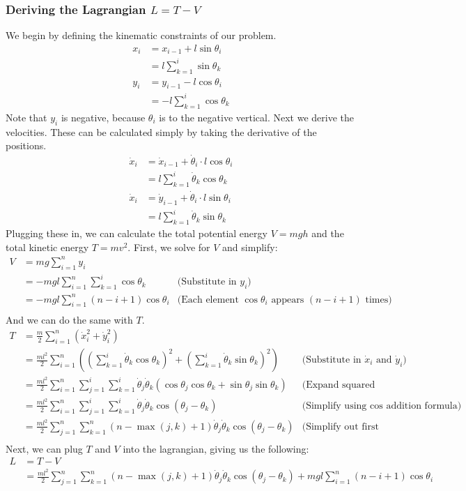 \documentclass{article}
\begin{document}
\subsubsection{Deriving the Lagrangian \texorpdfstring{$L=T-V$}{L=T-V}}
We begin by defining the kinematic constraints of our problem.
\begin{align*}
	x_i &= x_{i-1} + l\sin{\theta_i}\\
	&= l\sum_{k=1}^i\sin{\theta_k}\\
	y_i &= y_{i-1} - l\cos{\theta_i}\\
	&= -l\sum_{k=1}^i\cos{\theta_k}
\end{align*}
Note that $y_i$ is negative, because $\theta_i$ is to the negative vertical. Next we derive the velocities. These can be calculated simply by taking the derivative of the positions.
\begin{align*}
	\dot{x}_i &= \dot x_{i-1} + \dot\theta_i \cdot l\cos{\theta_i}\\
	&= l\sum_{k=1}^i\dot\theta_k\cos{\theta_k}\\
	\dot{x}_i &= \dot y_{i-1} + \dot\theta_i \cdot l\sin{\theta_i}\\
	&= l\sum_{k=1}^i\dot\theta_k\sin{\theta_k}
\end{align*}
Plugging these in, we can calculate the total potential energy $V=mgh$ and the total kinetic energy $T=mv^2$. First, we solve for $V$ and simplify:
\begin{align*}
	V &= mg\sum_{i=1}^n y_i \\
	&=-mgl\sum_{i=1}^n\sum_{k=1}^i\cos\theta_k
	&\text{(Substitute in $y_i$)}\\
	&=-mgl\sum_{i=1}^n (n-i+1)\cos\theta_i
	&\text{(Each element $\cos\theta_i$ appears $(n-i+1)$ times)}\\
\end{align*}
And we can do the same with $T$.
\begin{align*}
	T &= \frac{m}{2}\sum_{i=1}^n (\dot{x}_i^2+\dot{y}_i^2)\\
	&= \frac{ml^2}{2}\sum_{i=1}^n \left(\left(\sum_{k=1}^i\dot\theta_k\cos{\theta_k}\right)^2+\left(\sum_{k=1}^i\dot\theta_k\sin{\theta_k}\right)^2\right)
	&\text{(Substitute in $\dot x_i$ and $\dot y_i$)}\\
	&= \frac{ml^2}{2}\sum_{i=1}^n \sum_{j=1}^i\sum_{k=1}^i\dot\theta_j\dot\theta_k\left(\cos{\theta_j}\cos{\theta_k}+\sin{\theta_j}\sin{\theta_k}\right)
	&\text{(Expand squared sums)}\\
	&= \frac{ml^2}{2}\sum_{i=1}^n \sum_{j=1}^i\sum_{k=1}^i\dot\theta_j\dot\theta_k\cos(\theta_j-\theta_k)
	&\text{(Simplify using $\cos$ addition formula)}\\
	&= \frac{ml^2}{2} \sum_{j=1}^n\sum_{k=1}^n(n-\max(j,k)+1)\dot\theta_j\dot\theta_k\cos(\theta_j-\theta_k)
	&\text{(Simplify out first sum)}\\
\end{align*}
Next, we can plug $T$ and $V$ into the lagrangian, giving us the following:
\begin{align*}
	L &= T-V \\
	&=  \frac{ml^2}{2} \sum_{j=1}^n\sum_{k=1}^n(n-\max(j,k)+1)\dot\theta_j\dot\theta_k\cos(\theta_j-\theta_k) + mgl\sum_{i=1}^n (n-i+1)\cos\theta_i\\
\end{align*}
\end{document}
